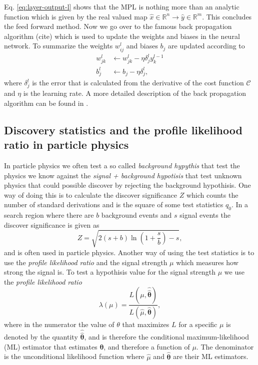 \documentclass[../../main/main.tex]{subfiles}
\begin{document}
Eq. \eqref{eq:layer-output-l} shows that the MPL is nothing more than an analytic function which is given by the real valued map \(\hat{x}\in\mathbb{R}^n \rightarrow\hat{y}\in\mathbb{R}^m\). This concludes the feed forward method. Now we go over to the famous back propagation algorithm (cite) which is used to update the weights and biases in the neural network. To summarize the weights \(w_{ij}^l\) and biases \(b_j\) are updated according to
\begin{align}
  w_{jk}^l &\leftarrow w_{jk}^l - \eta\delta_j^ly_k^{l-1} \label{eq:uptate-weight} \\
  b_j^l &\leftarrow b_j - \eta\delta_j^l \label{eq:uptate-bias},
\end{align} 
where \(\delta_j^l\) is the error that is calculated from the derivative of the cost function \(\mathcal{C}\) and \(\eta\) is the learning rate. A more detailed description of the back propagation algorithm can be found in \cite{morten}.
\subsection{Discovery statistics and the profile likelihood ratio in particle physics}
\label{sec:statistics} 

In particle physics we often test a so called \emph{background hypythis} that test the physics we know against the \emph{signal + background hypotisis} that test unknown physics that could possible discover by rejecting the background hypothisis. One way of doing this is to calculate the discover significance \(Z\) which counts the number of standard derivations and is the square of some test statistics \(q_0\). In a search region where there are \(b\) background events and \(s\) signal events the discover significance is given as
\begin{equation}
  \label{eq:discover-sig}
  Z = \sqrt{2(s+b)\ln\left(1 + \frac{s}{b}\right) - s},
\end{equation}
and is often used in particle physics. Another way of using the test statistics is to use the \emph{profile likelihood ratio} and the signal strength \(\mu\) which measures how strong the signal is.
To test a hypothisis value for the signal strength \(\mu\) we use the \emph{profile likelihood ratio} \cite{Cowan_2011}
\begin{equation}
  \label{eq:profile-likelihood-ratio}
  \lambda(\mu) = \frac{L(\mu,\hat{\hat{\bm{\theta}}})}{L(\hat{\mu},\bm{\hat{\theta}})},
\end{equation}
where in the numerator the value of \(\theta\) that maximizes \(L\) for a specific \(\mu\) is denoted by the quantity \(\hat{\hat{\bm{\theta}}}\), and is therefore the conditional maximum-likelihood (ML) estimator that estimates \(\bm{\theta}\), and therefore a function of \(\mu\). The denominator is the unconditional likelihood function where \(\hat{\mu}\) and \(\bm{\hat{\theta}}\) are their ML estimators.
\end{document}
